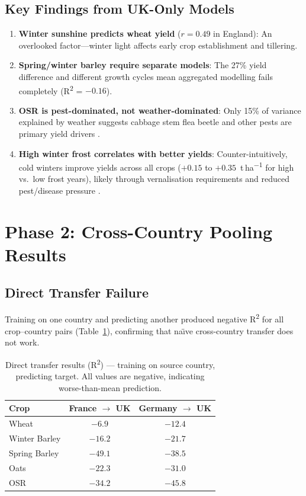 \documentclass[12pt,a4paper]{report}
\newcommand{\rsq}{R\textsuperscript{2}}
\newcommand{\tha}{t\,ha\textsuperscript{$-1$}}
\begin{document}
\subsection{Key Findings from UK-Only Models}

\begin{enumerate}
    \item \textbf{Winter sunshine predicts wheat yield} ($r = 0.49$ in England): An overlooked factor---winter light affects early crop establishment and tillering.
    \item \textbf{Spring/winter barley require separate models}: The 27\% yield difference and different growth cycles mean aggregated modelling fails completely (\rsq{} = $-0.16$).
    \item \textbf{OSR is pest-dominated, not weather-dominated}: Only 15\% of variance explained by weather suggests cabbage stem flea beetle and other pests are primary yield drivers \citep{ahdb2023c}.
    \item \textbf{High winter frost correlates with better yields}: Counter-intuitively, cold winters improve yields across all crops ($+0.15$ to $+0.35$~\tha{} for high vs.\ low frost years), likely through vernalisation requirements and reduced pest/disease pressure \citep{zheng2012}.
\end{enumerate}

\section{Phase 2: Cross-Country Pooling Results}

\subsection{Direct Transfer Failure}

Training on one country and predicting another produced negative \rsq{} for all crop--country pairs (Table~\ref{tab:direct_transfer_failure}), confirming that na\"{\i}ve cross-country transfer does not work.

\begin{table}[H]
\centering
\caption{Direct transfer results (\rsq{}) --- training on source country, predicting target. All values are negative, indicating worse-than-mean prediction.}
\label{tab:direct_transfer_failure}
\begin{tabular}{lcc}
\toprule
\textbf{Crop} & \textbf{France $\to$ UK} & \textbf{Germany $\to$ UK} \\
\midrule
Wheat & $-6.9$ & $-12.4$ \\
Winter Barley & $-16.2$ & $-21.7$ \\
Spring Barley & $-49.1$ & $-38.5$ \\
Oats & $-22.3$ & $-31.0$ \\
OSR & $-34.2$ & $-45.8$ \\
\bottomrule
\end{tabular}
\end{table}
\end{document}

